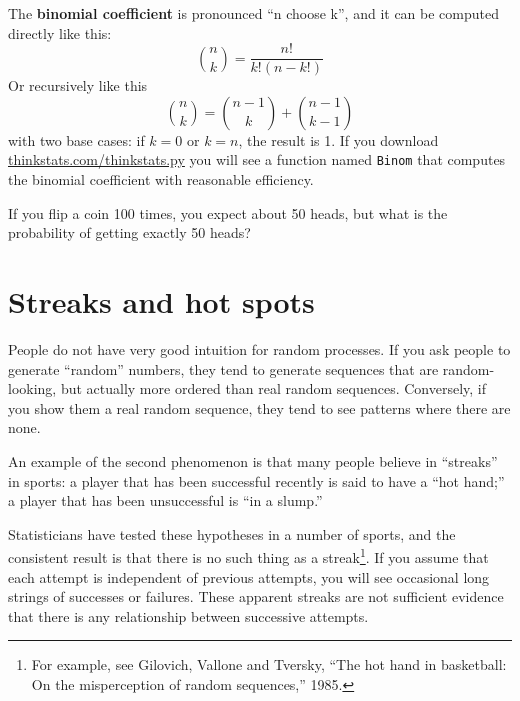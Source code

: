 \documentclass[12pt]{book}
\begin{document}

The {\bf binomial coefficient} is pronounced ``n choose k'', and it
can be computed directly like this:
%
\[ \binom{n}{k} = \frac{n!}{k!(n-k!)}  \]
%
Or recursively like this
%
\[ \binom{n}{k} = \binom{n-1}{k} + \binom{n-1}{k-1} \]
%
with two base cases: if $k=0$ or $k=n$, the result is 1.  If you
download \url{thinkstats.com/thinkstats.py} you will see a function
named {\tt Binom} that computes the binomial coefficient with reasonable
efficiency.


\begin{exercise}
If you flip a coin 100 times, you expect about 50 heads, but what
is the probability of getting exactly 50 heads?



\end{exercise}


\section{Streaks and hot spots}

People do not have very good intuition for random processes.  If you
ask people to generate ``random'' numbers, they tend to generate
sequences that are random-looking, but actually more ordered than real
random sequences.  Conversely, if you show them a real random
sequence, they tend to see patterns where there are none.

An example of the second phenomenon is that many people believe
in ``streaks'' in sports: a player that has been successful recently
is said to have a ``hot hand;'' a player that has been unsuccessful is
``in a slump.''


Statisticians have tested these hypotheses in a number of sports, and
the consistent result is that there is no such thing as a
streak\footnote{For example, see Gilovich, Vallone and Tversky, ``The
  hot hand in basketball: On the misperception of random sequences,''
  1985.}.  If you assume that each attempt is independent of previous
attempts, you will see occasional long strings of successes or
failures.  These apparent streaks are not sufficient evidence that
there is any relationship between successive attempts.
\end{document}
